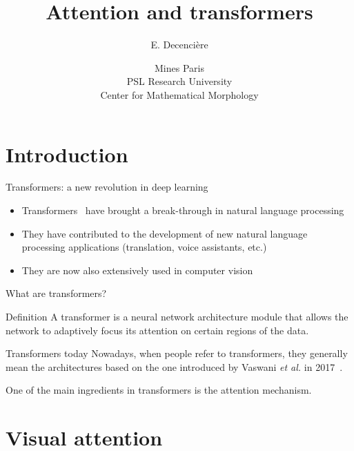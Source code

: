 \documentclass[xcolor=pdftex,dvipsnames,table,mathserif]{beamer}
\title{Attention and transformers}
\author{E. Decencière}
\date{Mines Paris\\
  PSL Research University\\
  Center for Mathematical Morphology
}
\begin{document}
\frame{\titlepage}


\section{Introduction}


\begin{frame}{Transformers: a new revolution in deep learning}

\begin{itemize}
\item Transformers~\cite{vaswani_attention_2017} have brought a break-through in natural language processing
  \item They have contributed to the development of new natural language processing applications (translation, voice assistants, etc.)
  \item They are now also extensively used in computer vision
\end{itemize}

\end{frame}


\begin{frame}{What are transformers?}

\begin{block}{Definition}
A transformer is a neural network architecture module that allows the network to \alert{adaptively focus its attention} on certain regions of the data.
\end{block}

\pause

\begin{alertblock}{Transformers today}
  Nowadays, when people refer to transformers, they generally mean the architectures based on the one introduced by Vaswani \textit{et al.} in 2017~\cite{vaswani_attention_2017}.
\end{alertblock}

\pause

One of the main ingredients in transformers is the attention mechanism.

\end{frame}


\section{Visual attention}
\end{document}
